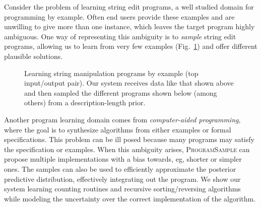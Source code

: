\documentclass{article}
\newcommand{\theSystem}{\textsc{ProgramSample}}
\begin{document}
Consider the problem of learning string edit programs, a well studied domain for programming by example.
Often end users provide these examples and are unwilling to give more than one instance,
which leaves the target program highly ambiguous.
One way of representing this ambiguity is to \emph{sample} string edit programs,
allowing us to learn from very few examples (Fig.~\ref{ambiguous})
and offer different plausible solutions.


  
\begin{figure}
  \centering\vspace{-1cm}
  \caption{Learning string manipulation programs by example (top input/output pair). Our system receives data like that shown above and then sampled the different programs shown below (among others) from a description-length prior.}
  \label{ambiguous}
\end{figure}


Another program learning domain comes from \emph{computer-aided programming}, where the goal is to synthesize algorithms from
either examples or formal specifications.
This problem can be ill posed because many programs may satisfy the specification or examples.
When this ambiguity arises,
\theSystem{} can propose multiple implementations with a bias towards, eg, shorter or simpler ones.
The samples can also be used to efficiently approximate the posterior predictive distribution, effectively integrating out the program.
We show our system  learning counting routines and recursive sorting/reversing algorithms
while modeling the uncertainty over the correct implementation of the algorithm.
\end{document}
